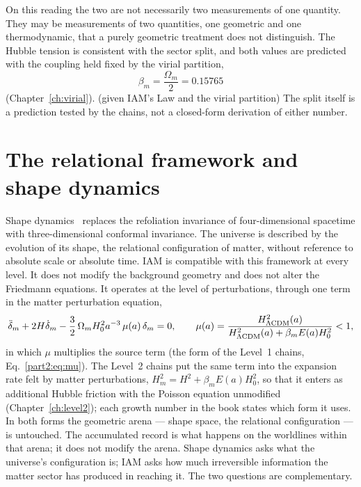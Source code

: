 On this reading the two are not necessarily two measurements of one quantity. They may be measurements of two quantities, one geometric and one
thermodynamic, that a purely geometric treatment does not distinguish. The Hubble tension is consistent with the sector split, and both values are
predicted with the coupling held fixed by the virial partition,
\begin{equation}
\beta_m=\frac{\Omega_m}{2}=0.15765\label{eq:time_betam}
\end{equation}
(Chapter~\ref{ch:virial}). \derived{} (given IAM's Law and the virial partition) The split itself is a prediction tested by the chains, not a
closed-form derivation of either number. \prediction

\section{The relational framework and shape dynamics}\label{sec:time_shape}
Shape dynamics~\cite{Barbour2012,BarbourKoslowskiMercati2014} replaces the refoliation invariance of four-dimensional spacetime with three-dimensional
conformal invariance. The universe is described by the evolution of its shape, the relational configuration of matter, without reference to absolute
scale or absolute time. IAM is compatible with this framework at every level. It does not modify the background geometry and does not alter the
Friedmann equations. It operates at the level of perturbations, through one term in the matter perturbation equation,
\begin{equation}
\ddot\delta_m+2H\dot\delta_m-\frac32\,\Omega_mH_0^2a^{-3}\,\mu(a)\,\delta_m=0,\qquad
\mu(a)=\frac{H^2_{\Lambda\rm CDM}(a)}{H^2_{\Lambda\rm CDM}(a)+\beta_mE(a)H_0^2}<1,\label{eq:time_growth}
\end{equation}
in which $\mu$ multiplies the source term (the form of the Level~1 chains, Eq.~\ref{part2:eq:mu}). \derived{} The Level~2 chains put the same term into
the expansion rate felt by matter perturbations, $H_m^2=H^2+\beta_mE(a)H_0^2$, so that it enters as additional Hubble friction with the Poisson equation
unmodified (Chapter~\ref{ch:level2}); each growth number in the book states which form it uses. In both forms the geometric arena --- shape space, the
relational configuration --- is untouched. The accumulated record is what happens on the worldlines within that arena; it does not modify the arena.
Shape dynamics asks what the universe's configuration is; IAM asks how much irreversible information the matter sector has produced in reaching it. The
two questions are complementary. \interp


